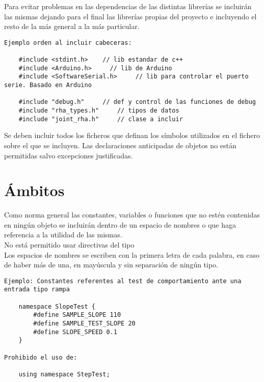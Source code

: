 
    Para evitar problemas en las dependencias de las distintas librerías se incluirán las mismas dejando para el final las librerías propias del proyecto e incluyendo el resto de la más general a la más particular. 
    \\ 
    
    \lstset{language=C, breaklines=true, basicstyle=\footnotesize}
    \begin{lstlisting}[frame=single]
Ejemplo orden al incluir cabeceras:

    #include <stdint.h>    // lib estandar de c++
    #include <Arduino.h>     // lib de Arduino
    #include <SoftwareSerial.h>     // lib para controlar el puerto serie. Basado en Arduino
    
    #include "debug.h"     // def y control de las funciones de debug
    #include "rha_types.h"     // tipos de datos
    #include "joint_rha.h"     // clase a incluir
    \end{lstlisting}
    
    Se deben incluir todos los ficheros que definan los símbolos utilizados en el fichero sobre el que se incluyen. Las declaraciones anticipadas de objetos no están permitidas salvo excepciones justificadas.
 
\section{Ámbitos}\label{sec:codificacionSW:ambitos}

    Como norma general las constantes, variables o funciones que no estén contenidas en ningún objeto se incluirán dentro de un espacio de nombres o  que haga referencia a la utilidad de las mismas.
    \\ 
    
    No está permitido usar directivas del tipo 
    \\ 
    
    Los espacios de nombres se escriben con la primera letra de cada palabra, en caso de haber más de una, en mayúscula y sin separación de ningún tipo.
    \\ 
    
    \lstset{language=C, breaklines=true, basicstyle=\footnotesize}
    \begin{lstlisting}[frame=single]
Ejemplo: Constantes referentes al test de comportamiento ante una entrada tipo rampa

    namespace SlopeTest {
        #define SAMPLE_SLOPE 110
        #define SAMPLE_TEST_SLOPE 20
        #define SLOPE_SPEED 0.1
    }
    
Prohibido el uso de:
    
    using namespace StepTest;
    \end{lstlisting}
    
